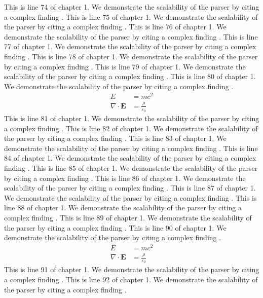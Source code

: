 This is line 74 of chapter 1. We demonstrate the scalability of the parser by citing a complex finding \cite{ref1_74}.
This is line 75 of chapter 1. We demonstrate the scalability of the parser by citing a complex finding \cite{ref1_75}.
This is line 76 of chapter 1. We demonstrate the scalability of the parser by citing a complex finding \cite{ref1_76}.
This is line 77 of chapter 1. We demonstrate the scalability of the parser by citing a complex finding \cite{ref1_77}.
This is line 78 of chapter 1. We demonstrate the scalability of the parser by citing a complex finding \cite{ref1_78}.
This is line 79 of chapter 1. We demonstrate the scalability of the parser by citing a complex finding \cite{ref1_79}.
This is line 80 of chapter 1. We demonstrate the scalability of the parser by citing a complex finding \cite{ref1_80}.
\begin{align*}
  E &= mc^2 \\
  \nabla \cdot \mathbf{E} &= \frac{\rho}{\varepsilon_0}
\end{align*}
This is line 81 of chapter 1. We demonstrate the scalability of the parser by citing a complex finding \cite{ref1_81}.
This is line 82 of chapter 1. We demonstrate the scalability of the parser by citing a complex finding \cite{ref1_82}.
This is line 83 of chapter 1. We demonstrate the scalability of the parser by citing a complex finding \cite{ref1_83}.
This is line 84 of chapter 1. We demonstrate the scalability of the parser by citing a complex finding \cite{ref1_84}.
This is line 85 of chapter 1. We demonstrate the scalability of the parser by citing a complex finding \cite{ref1_85}.
This is line 86 of chapter 1. We demonstrate the scalability of the parser by citing a complex finding \cite{ref1_86}.
This is line 87 of chapter 1. We demonstrate the scalability of the parser by citing a complex finding \cite{ref1_87}.
This is line 88 of chapter 1. We demonstrate the scalability of the parser by citing a complex finding \cite{ref1_88}.
This is line 89 of chapter 1. We demonstrate the scalability of the parser by citing a complex finding \cite{ref1_89}.
This is line 90 of chapter 1. We demonstrate the scalability of the parser by citing a complex finding \cite{ref1_90}.
\begin{align*}
  E &= mc^2 \\
  \nabla \cdot \mathbf{E} &= \frac{\rho}{\varepsilon_0}
\end{align*}
This is line 91 of chapter 1. We demonstrate the scalability of the parser by citing a complex finding \cite{ref1_91}.
This is line 92 of chapter 1. We demonstrate the scalability of the parser by citing a complex finding \cite{ref1_92}.

